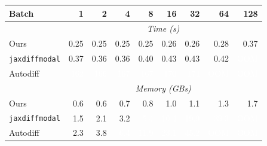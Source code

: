 \begin{tabular}{@{}l*{8}{r}@{}}
\hline
Batch & 1 & 2 & 4 & 8 & 16 & 32 & 64 & 128\\
\hline
 & \multicolumn{8}{c}{\textit{Time (s)}}\\
Ours & \cellcolor{tabpurple!0}0.25 & \cellcolor{tabpurple!0}0.25 & \cellcolor{tabpurple!0}0.25 & \cellcolor{tabpurple!0}0.25 & \cellcolor{tabpurple!8}0.26 & \cellcolor{tabpurple!8}0.26 & \cellcolor{tabpurple!15}0.28 & \cellcolor{tabpurple!31}0.37\\
\texttt{jaxdiffmodal} & \cellcolor{tabpurple!31}0.37 & \cellcolor{tabpurple!23}0.36 & \cellcolor{tabpurple!23}0.36 & \cellcolor{tabpurple!38}0.40 & \cellcolor{tabpurple!54}0.43 & \cellcolor{tabpurple!54}0.43 & \cellcolor{tabpurple!46}0.42 & \cellcolor{tabpurple!100}\textcolor{white}{OOM}\\
Autodiff & \cellcolor{tabpurple!62}\textcolor{white}{162} & \cellcolor{tabpurple!69}\textcolor{white}{166} & \cellcolor{tabpurple!77}\textcolor{white}{167} & \cellcolor{tabpurple!77}\textcolor{white}{167} & \cellcolor{tabpurple!85}\textcolor{white}{170} & \cellcolor{tabpurple!92}\textcolor{white}{174} & \cellcolor{tabpurple!100}\textcolor{white}{OOM} & \cellcolor{tabpurple!100}\textcolor{white}{OOM}\\
\hline
 & \multicolumn{8}{c}{\textit{Memory (GBs)}}\\
Ours & \cellcolor{tabpurple!0}0.6 & \cellcolor{tabpurple!0}0.6 & \cellcolor{tabpurple!5}0.7 & \cellcolor{tabpurple!10}0.8 & \cellcolor{tabpurple!15}1.0 & \cellcolor{tabpurple!20}1.1 & \cellcolor{tabpurple!25}1.3 & \cellcolor{tabpurple!35}1.7\\
\texttt{jaxdiffmodal} & \cellcolor{tabpurple!30}1.5 & \cellcolor{tabpurple!40}2.1 & \cellcolor{tabpurple!50}3.2 & \cellcolor{tabpurple!60}\textcolor{white}{5.4} & \cellcolor{tabpurple!70}\textcolor{white}{10.4} & \cellcolor{tabpurple!80}\textcolor{white}{19.9} & \cellcolor{tabpurple!90}\textcolor{white}{39.3} & \cellcolor{tabpurple!100}\textcolor{white}{OOM}\\
Autodiff & \cellcolor{tabpurple!45}2.3 & \cellcolor{tabpurple!55}3.8 & \cellcolor{tabpurple!65}\textcolor{white}{6.4} & \cellcolor{tabpurple!75}\textcolor{white}{11.9} & \cellcolor{tabpurple!85}\textcolor{white}{23.1} & \cellcolor{tabpurple!95}\textcolor{white}{45.2} & \cellcolor{tabpurple!100}\textcolor{white}{OOM} & \cellcolor{tabpurple!100}\textcolor{white}{OOM}\\
\hline
\end{tabular}
